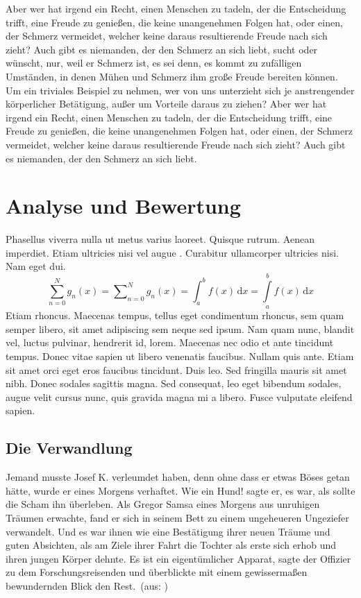 \documentclass[paper=a4,fontsize=12pt,ngerman]{scrartcl}
\begin{document}
Aber wer hat irgend ein Recht, einen Menschen zu tadeln, der die Entscheidung 
trifft, eine Freude zu genießen, die keine unangenehmen Folgen hat, oder 
einen, der Schmerz vermeidet, welcher keine daraus resultierende Freude nach 
sich zieht? Auch gibt es niemanden, der den Schmerz an sich liebt, sucht oder 
wünscht, nur, weil er Schmerz ist, es sei denn, es kommt zu zufälligen 
Umständen, in denen Mühen und Schmerz ihm große Freude bereiten können. Um 
ein triviales Beispiel zu nehmen, wer von uns unterzieht sich je 
anstrengender körperlicher Betätigung, außer um Vorteile daraus zu ziehen? 
Aber wer hat irgend ein Recht, einen Menschen zu tadeln, der die Entscheidung 
trifft, eine Freude zu genießen, die keine unangenehmen Folgen hat, oder 
einen, der Schmerz vermeidet, welcher keine daraus resultierende Freude nach 
sich zieht? Auch gibt es niemanden, der den Schmerz an sich liebt.

\section{Analyse und Bewertung}
Phasellus viverra nulla ut metus varius laoreet. Quisque rutrum. Aenean 
imperdiet. Etiam ultricies nisi vel augue \cite{ab94}. Curabitur ullamcorper 
ultricies nisi. Nam eget dui. 
\begin{equation}
  \sum_{n=0}^N g_n(x) = \sum\nolimits_{n=0}^N g_n(x) =
  \int_a^b f(x) \,\mbox{d}x = \int\limits_a^b f(x) \,\mbox{d}x 
\end{equation}
Etiam rhoncus. Maecenas tempus, tellus eget condimentum rhoncus, sem quam 
semper libero, sit amet adipiscing sem neque sed ipsum. Nam quam nunc, 
blandit vel, luctus pulvinar, hendrerit id, lorem. Maecenas nec odio et ante 
\cite{ah2006} tincidunt tempus. Donec vitae sapien ut libero venenatis 
faucibus. Nullam quis ante. Etiam sit amet orci eget eros faucibus tincidunt. 
Duis leo. Sed fringilla mauris sit amet nibh. Donec sodales sagittis magna. 
Sed consequat, leo eget bibendum sodales, augue velit cursus nunc, quis 
gravida magna mi a libero. Fusce vulputate eleifend sapien.

\subsection{Die Verwandlung}
\glqq Jemand musste Josef K. verleumdet haben, denn ohne dass er etwas Böses 
getan hätte, wurde er eines Morgens verhaftet. Wie ein Hund! sagte er, es 
war, als sollte die Scham ihn überleben. Als Gregor Samsa eines Morgens aus 
unruhigen Träumen erwachte, fand er sich in seinem Bett zu einem ungeheueren 
Ungeziefer verwandelt. Und es war ihnen wie eine Bestätigung ihrer neuen 
Träume und guten Absichten, als am Ziele ihrer Fahrt die Tochter als erste 
sich erhob und ihren jungen Körper dehnte. Es ist ein eigentümlicher Apparat, 
sagte der Offizier zu dem Forschungsreisenden und überblickte mit einem 
gewissermaßen bewundernden Blick den Rest.\grqq \ (aus: \cite{kaf12})
\end{document}
